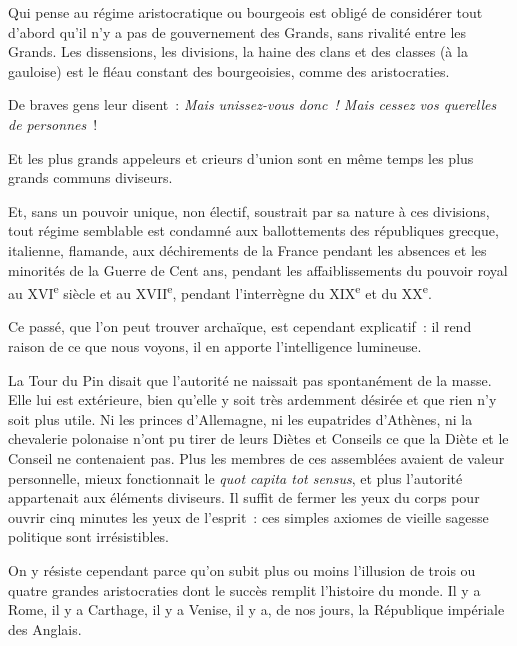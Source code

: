 \documentclass[french,twoside]{book} %
\newcommand{\astermono}{\medskip\centerline{\color{rubric}\large\selectfont{\syms ✻}}\medskip\par}%
\begin{document}
\astermono

\noindent Qui pense au régime aristocratique ou bourgeois est obligé de considérer tout d’abord qu’il n’y a pas de gouvernement des Grands, sans rivalité entre les Grands. Les dissensions, les divisions, la haine des clans et des classes (à la gauloise) est le fléau constant des bourgeoisies, comme des aristocraties.\par
De braves gens leur disent : \emph{Mais unissez-vous donc ! Mais cessez vos querelles de personnes} !\par
Et les plus grands appeleurs et crieurs d’union sont en même temps les plus grands communs diviseurs.\par
Et, sans un pouvoir unique, non électif, soustrait par sa nature à ces divisions, tout régime semblable est condamné aux ballottements des républiques grecque, italienne, flamande, aux déchirements de la France pendant les absences et les minorités de la Guerre de Cent ans, pendant les affaiblissements du pouvoir royal au XVI\textsuperscript{e} siècle et au XVII\textsuperscript{e}, pendant l’interrègne du XIX\textsuperscript{e} et du XX\textsuperscript{e}.\par
Ce passé, que l’on peut trouver archaïque, est cependant explicatif : il rend raison de ce que nous voyons, il en apporte l’intelligence lumineuse.\par

\astermono

\noindent La Tour du Pin disait que l’autorité ne naissait pas spontanément de la masse. Elle lui est extérieure, bien qu’elle y soit très ardemment désirée et que rien n’y soit plus utile. Ni les princes d’Allemagne, ni les eupatrides d’Athènes, ni la chevalerie polonaise n’ont pu tirer de leurs Diètes et Conseils ce que la Diète et le Conseil ne contenaient pas. Plus les membres de ces assemblées avaient de valeur personnelle, mieux fonctionnait le \emph{quot capita tot sensus}, et plus l’autorité appartenait aux éléments diviseurs. Il suffit de fermer les yeux du corps pour ouvrir cinq minutes les yeux de l’esprit : ces simples axiomes de vieille sagesse politique sont irrésistibles.\par
On y résiste cependant parce qu’on subit plus ou moins l’illusion de trois ou quatre grandes aristocraties dont le succès remplit l’histoire du monde. Il y a Rome, il y a Carthage, il y a Venise, il y a, de nos jours, la République impériale des Anglais.\par

\astermono
\end{document}
